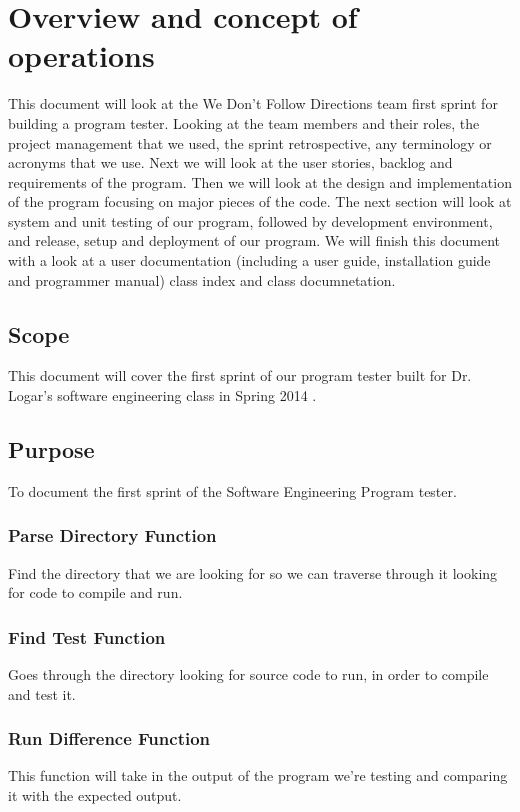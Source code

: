 
\chapter{Overview and concept of operations}

This document will look at the We Don't Follow Directions team first sprint for building
a program tester. Looking at the team members and their roles, the project
management that we used, the sprint retrospective, any terminology or acronyms
that we use. Next we will look at the user stories, backlog and requirements of the
program. Then we will look at the design and implementation of the program focusing
on major pieces of the code. The next section will look at system and unit testing of 
our program, followed by development environment, and release, setup and
deployment of our program. We will finish this document with a look at a user 
documentation (including a user guide, installation guide and programmer manual)
class index and class documnetation.


\section{Scope}
This document will cover the first sprint of our program tester built for Dr. Logar's
software engineering class in Spring 2014 .


\section{Purpose}
To document the first sprint of the Software Engineering Program tester.


\subsection{Parse Directory Function}
Find the directory that we are looking for so we can traverse through it looking
for code to compile and run.

\subsection{Find Test Function}
Goes through the directory looking for source code to run, in order to compile
and test it.

\subsection{Run Difference Function}
This function will take in the output of the program we're testing and comparing it
with the expected output.

